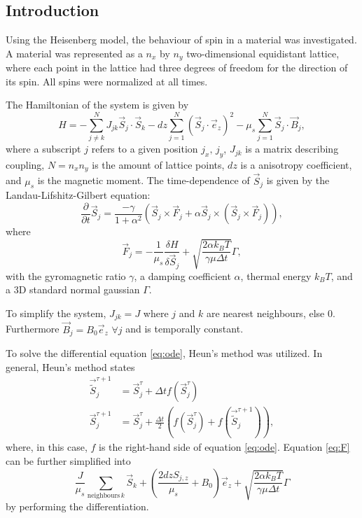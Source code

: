 \subsection*{Introduction}
Using the Heisenberg model, the behaviour of spin in a material was investigated.
A material was represented as a $n_x$ by $n_y$ two-dimensional equidistant lattice, 
where each point in the lattice had three degrees of freedom for the direction of its spin.
All spins were normalized at all times. 

The Hamiltonian of the system is given by 
\begin{equation}
    \label{eq:lewis}
    H = - \sum_{j \neq k}^NJ_{jk}\vec{S}_j\cdot\vec{S}_k
        - dz \sum_{j = 1}^N(\vec{S}_j\cdot\vec{e}_z)^2
        - \mu_s \sum_{j = 1}^N \vec{S}_j \cdot \vec{B}_j,
\end{equation}
where a subscript $j$ refers to a given position $j_x,\, j_y$, $J_{jk}$ is a matrix describing coupling, 
$N = n_xn_y$ is the amount of lattice points,
$dz$ is a anisotropy coefficient, and $\mu_s$ is the magnetic moment. 
The time-dependence of $\vec{S}_j$ is given by the Landau-Lifshitz-Gilbert equation:
\begin{equation}
    \label{eq:ode}
    \frac{\partial}{\partial t} \vec{S}_j = \frac{-\gamma}{1 + \alpha^2}
    \left(\vec{S}_j\times\vec{F}_j + \alpha\vec{S}_j \times \left(\vec{S}_j\times\vec{F}_j\right)\right),
\end{equation}
where
\begin{equation}
    \label{eq:F}
    \vec{F}_j = -\frac{1}{\mu_s}\frac{\delta H}{\delta \vec{S}_j} 
                + \sqrt{\frac{2\alpha k_BT}{\gamma\mu\Delta t}}\Gamma,
\end{equation}
with the gyromagnetic ratio $\gamma$, a damping coefficient $\alpha$, 
thermal energy $k_BT$, and a 3D standard normal gaussian $\Gamma$.

To simplify the system, $J_{jk} = J$ where $j$ and $k$ are nearest neighbours, else 0. 
Furthermore $\vec{B}_j = B_0\vec{e}_z \,\,\forall j$ and is temporally constant.

To solve the differential equation \ref{eq:ode}, Heun's method was utilized. 
In general, Heun's method states
\begin{align*}
    \vec{\tilde{S}}_j^{\tau + 1} &= \vec{S}_j^\tau + \Delta t f(\vec{S}_j^\tau)\\
    \vec{S}_j^{\tau + 1} &= \vec{S}_j^\tau + 
            \frac{\Delta t}{2}\left(f(\vec{S}_j^\tau) + f(\vec{\tilde{S}}_j^{\tau + 1})\right),
\end{align*}
where, in this case, $f$ is the right-hand side of equation \ref{eq:ode}.
Equation \ref{eq:F} can be further simplified into 
\begin{equation}
    \label{eq:simp}
    \frac{J}{\mu_s}\sum_{\text{neighbours}\,k}\vec{S}_k
        + \left(\frac{2dzS_{j, z}}{\mu_s} + B_0\right)\vec{e}_z
        + \sqrt{\frac{2\alpha k_BT}{\gamma\mu\Delta t}}\Gamma
\end{equation}
by performing the differentiation.

